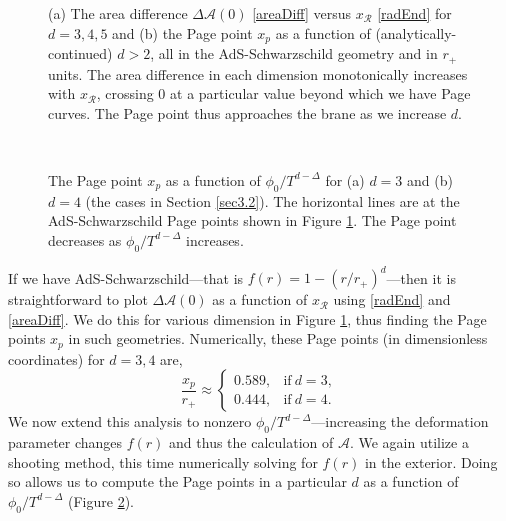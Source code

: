 \documentclass[12pt,a4paper]{article}
\begin{document}
\begin{figure}
\centering
{}\qquad
{}
\caption{(a) The area difference $\Delta\mathcal{A}(0)$ \eqref{areaDiff} versus $x_\mathcal{R}$ \eqref{radEnd} for $d = 3,4,5$ and (b) the Page point $x_p$ as a function of (analytically-continued) $d > 2$, all in the AdS-Schwarzschild geometry and in $r_+$ units. The area difference in each dimension monotonically increases with $x_\mathcal{R}$, crossing $0$ at a particular value beyond which we have Page curves. The Page point thus approaches the brane as we increase $d$.}
\label{figs:pagePointAS}
\end{figure}
{
\begin{figure}
\centering
\\\vspace{0.4cm}
\caption{The Page point $x_p$ as a function of $\phi_0/T^{d-\Delta}$ for (a) $d = 3$ and (b) $d = 4$ (the cases in Section \ref{sec3.2}). The horizontal lines are at the AdS-Schwarzschild Page points shown in Figure \ref{figs:pagePointAS}. The Page point decreases as $\phi_0/T^{d-\Delta}$ increases.}
\label{figs:pagePointKasner}
\end{figure}
}


If we have AdS-Schwarzschild---that is $f(r) = 1 - (r/r_+)^d$---then it is straightforward to plot $\Delta\mathcal{A}(0)$ as a function of $x_\mathcal{R}$ using \eqref{radEnd} and \eqref{areaDiff}. We do this for various dimension in Figure \ref{figs:pagePointAS}, thus finding the Page points $x_p$ in such geometries. Numerically, these Page points (in dimensionless coordinates) for $d = 3,4$ are,
\begin{equation}
\frac{x_p}{r_+} \approx \begin{cases}
0.589,&\text{if}\ d = 3,\\
0.444,&\text{if}\ d = 4.
\end{cases}
\end{equation}
We now extend this analysis to nonzero $\phi_0/T^{d-\Delta}$---increasing the deformation parameter changes $f(r)$ and thus the calculation of $\mathcal{A}$. We again utilize a shooting method, this time numerically solving for $f(r)$ in the exterior. Doing so allows us to compute the Page points in a particular $d$ as a function of $\phi_0/T^{d-\Delta}$ (Figure \ref{figs:pagePointKasner}).
\end{document}
